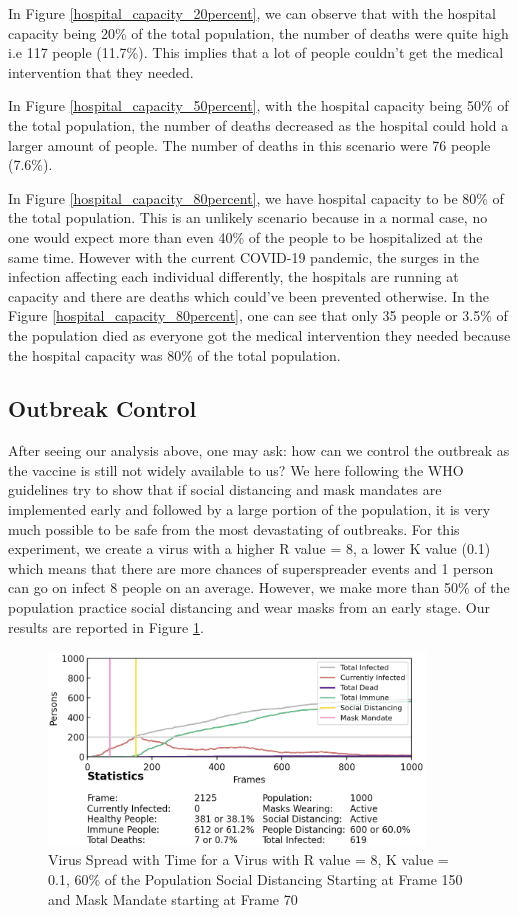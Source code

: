 \documentclass[11pt]{article}
\begin{document}
In Figure \ref{hospital_capacity_20percent}, we can observe that with the hospital capacity being 20\% of the total population, the number of deaths were quite high i.e 117 people (11.7\%). This implies that a lot of people couldn't get the medical intervention that they needed. 

In Figure \ref{hospital_capacity_50percent}, with the hospital capacity being 50\% of the total population, the number of deaths decreased as the hospital could hold a larger amount of people. The number of deaths in this scenario were 76 people (7.6\%). 

In Figure \ref{hospital_capacity_80percent}, we have hospital capacity to be 80\% of the total population. This is an unlikely scenario because in a normal case, no one would expect more than even 40\% of the people to be hospitalized at the same time. However with the current COVID-19 pandemic, the surges in the infection affecting each individual differently, the hospitals are running at capacity and there are deaths which could've been prevented otherwise. In the Figure \ref{hospital_capacity_80percent}, one can see that only 35 people or 3.5\% of the population died as everyone got the medical intervention they needed because the hospital capacity was 80\% of the total population.

\subsection{Outbreak Control} 
After seeing our analysis above, one may ask: how can we control the outbreak as the vaccine is still not widely available to us? We here following the WHO guidelines\cite{who_guidelines} try to show that if social distancing and mask mandates are implemented early and followed by a large portion of the population, it is very much possible to be safe from the most devastating of outbreaks. For this experiment, we create a virus with a higher R value = 8, a lower K value (0.1) which means that there are more chances of superspreader events and 1 person can go on infect 8 people on an average. However, we make more than 50\% of the population practice social distancing and wear masks from an early stage. Our results are reported in Figure \ref{outbreak control}. 

\begin{figure}[H]
    \centering
    \includegraphics[width=10cm]{figures/outbreak_control.png}
    \caption{Virus Spread with Time for a Virus with R value = 8, K value = 0.1, 60\% of the Population Social Distancing Starting at Frame 150 and Mask Mandate starting at Frame 70}
    \label{outbreak control}
\end{figure}
\end{document}
